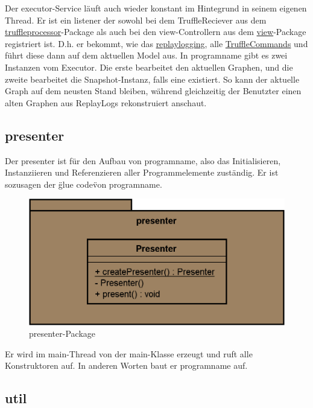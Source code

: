     Der executor-Service läuft auch wieder konstant im Hintegrund in seinem
    eigenen Thread. Er ist ein \gls{listener} der sowohl bei dem TruffleReciever aus dem
    \hyperref[subsubsec:truffleprocessor]{truffleprocessor}-Package als
    auch bei den view-Controllern aus dem \hyperref[subsec:view]{view}-Package
    registriert ist. D.h. er bekommt, wie das \hyperref[subsubsec:replaylogging]{replaylogging},
    alle \hyperref[subsubsec:trufflecommand]{TruffleCommands} und führt diese
    dann auf dem aktuellen Model aus.
    \newline
    \newline
    In \gls{programname} gibt es zwei Instanzen vom Executor. Die erste bearbeitet
    den aktuellen Graphen, und die zweite bearbeitet die Snapshot-Instanz, falls
    eine existiert. So kann der aktuelle Graph auf dem neusten Stand bleiben, während
    gleichzeitig der Benutzter einen alten Graphen aus
    ReplayLogs rekonstruiert anschaut.


\subsection{presenter}
\label{subsec:presenter}

Der presenter ist für den Aufbau von \gls{programname}, also das
Initialisieren, Instanziieren und Referenzieren aller Programmelemente zuständig.
Er ist sozusagen der \"glue code\" von \gls{programname}.

\begin{figure}[H]
  \centering
  \includegraphics[width=\textwidth]{../diagramimages/presenter.png}
  \caption{presenter-Package}
\end{figure}

Er wird im main-Thread von der main-Klasse erzeugt und ruft alle Konstruktoren auf.
In anderen Worten baut er \gls{programname} auf.

\subsection{util}
\label{subsec:util}


